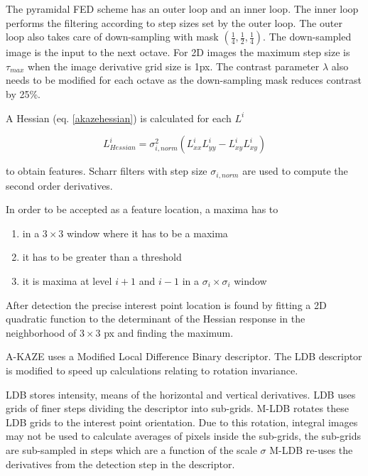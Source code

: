 \documentclass[english,12pt,a4paper,pdftex,elec,utf8, table]{aaltothesis}
\begin{document}
The pyramidal FED scheme has an outer loop and an inner loop. The inner loop performs the filtering according to step sizes set by the outer loop. The outer loop also takes care of down-sampling with mask $(\frac{1}{4}, \frac{1}{2}, \frac{1}{4})$. The down-sampled image is the input to the next octave. For 2D images the maximum step size is $\tau_{max}$ when the image derivative grid size is 1px. The contrast parameter $\lambda$ also needs to be modified for each octave as the down-sampling mask reduces contrast by 25\%.

A Hessian (eq. \ref{akazehessian}) is calculated for each $L^i$

\begin{equation}
  \label{akazehessian}
L^i_{Hessian} = \sigma^2_{i,norm}(L^i_{xx}L^i_{yy}-L^i_{xy}L^i_{xy})
\end{equation}

to obtain features. Scharr filters with step size $\sigma_{i,norm}$ are used to compute the second order derivatives.

In order to be accepted as a feature location, a maxima has to

\begin{enumerate}
\item in a $3 \times 3$ window where it has to be a maxima
\item it has to be greater than a threshold
\item it is maxima at level $i+1$ and $i-1$ in a $\sigma_i\times\sigma_i$ window
\end{enumerate}

After detection the precise interest point location is found by fitting a 2D quadratic function to the determinant of the Hessian response in the neighborhood of $3 \times 3$ px and finding the maximum.

A-KAZE uses a Modified Local Difference Binary descriptor. The LDB descriptor is modified to speed up calculations relating to rotation invariance.

LDB stores intensity, means of the horizontal and vertical derivatives. LDB uses grids of finer steps dividing the descriptor into sub-grids. M-LDB rotates these LDB grids to the interest point orientation. Due to this rotation, integral images may not be used to calculate averages of pixels inside the sub-grids, the sub-grids are sub-sampled in steps which are a function of the scale $\sigma$ M-LDB re-uses the derivatives from the detection step in the descriptor.

\end{document}
